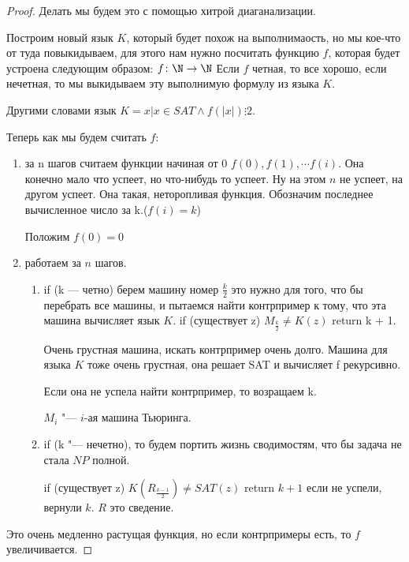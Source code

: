 \begin{proof}
Делать мы будем это с помощью хитрой диаганализации.

Построим новый язык $K$, который будет похож на 
выполнимаость, но мы кое-что от туда повыкидываем, 
для этого нам нужно посчитать функцию $f$, которая 
будет устроена следующим образом:
$f\colon \N \to \N$  
Если $f$ четная, то все хорошо, если нечетная, 
то мы выкидываем эту выполнимую формулу из языка $K$.

Другими словами язык $K = {x | x \in SAT \wedge f(|x|) \vdots 2}$.

Теперь как мы будем считать $f$:
\begin{enumerate}
    \item за n шагов считаем функции начиная от 0 $f(0), f(1), \cdots f(i)$. 
    Она конечно мало что успеет, но что-нибудь то успеет. Ну на этом $n$ не 
    успеет, на другом успеет. Она такая, неторопливая функция. Обозначим 
    последнее вычисленное число за k.($f(i) = k$)
    
    Положим $f(0) = 0$\\
    \item работаем за $n$ шагов. 
    \begin{enumerate}
    \item if (k --- четно) берем машину номер $\frac{k}{2}$ это нужно для 
    того, что бы перебрать все машины, и пытаемся найти контрпример к тому, 
    что эта машина вычисляет язык $K$. if (существует z) $M_{\frac{k}{2}} \ne K(z)$  return k + 1. 

    Очень грустная машина, искать контрпример очень долго. Машина для языка $K$ тоже 
    очень грустная, она решает SAT и вычисляет f рекурсивно. 

    Если она не успела найти контрпример, то возращаем k. 
    
    $M_i$ "--- $i$-ая машина Тьюринга. 
    \item if (k "--- нечетно), то будем портить  жизнь сводимостям, 
    что бы задача не стала $NP$ полной. 

    if (существует z) $K(R_{\frac{k - 1}{2}}) \ne SAT(z)$ return $k + 1$
    если не успели, вернули $k$. $R$ это сведение. 
    \end{enumerate} 
\end{enumerate}

Это очень медленно растущая функция, но если контрпримеры есть, 
то $f$ увеличивается.


\end{proof}
